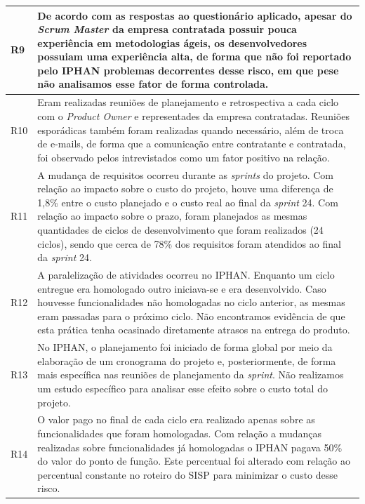 \begin{longtable}{|p{2cm}|p{13cm}|}
R9                                                                & De acordo com as respostas ao questionário aplicado, apesar do \textit{Scrum Master} da empresa contratada possuir pouca experiência em metodologias ágeis, os desenvolvedores possuiam uma experiência alta, de forma que não foi reportado pelo IPHAN problemas decorrentes desse risco, em que pese não analisamos esse fator de forma controlada.              \\ \hline
R10                                                               &  Eram realizadas reuniões de planejamento e retrospectiva a cada ciclo com o \textit{Product Owner} e representades da empresa contratadas. Reuniões esporádicas também foram realizadas quando necessário, além de troca de e-mails, de forma que a comunicação entre contratante e contratada, foi observado pelos intrevistados como um fator positivo na relação.                \\ \hline
R11                                                               & A mudança de requisitos ocorreu  durante as \textit{sprints} do projeto. Com relação ao impacto sobre o custo do projeto, houve uma diferença de 1,8\% entre o custo planejado e o custo real ao final da \textit{sprint} 24. Com relação ao impacto sobre o prazo, foram planejados as mesmas quantidades de ciclos de desenvolvimento que foram realizados (24 ciclos), sendo que cerca de 78\% dos requisitos foram atendidos ao final da \textit{sprint} 24.         \\ \hline
R12                                                               & A paralelização de atividades ocorreu no IPHAN. Enquanto um ciclo entregue era homologado outro iniciava-se e era desenvolvido. Caso houvesse funcionalidades não homologadas no ciclo anterior, as mesmas eram passadas para o próximo ciclo. Não encontramos evidência de que esta prática tenha ocasinado diretamente atrasos na entrega do produto.             \\ \hline
R13                                                               & No IPHAN, o planejamento foi iniciado de forma global por meio da elaboração de um cronograma do projeto e, posteriormente, de forma mais específica nas reuniões de planejamento da \textit{sprint}. Não realizamos um estudo específico para analisar esse efeito sobre o custo total do projeto.             \\ \hline
R14                                                               & O valor pago no final de cada ciclo era realizado apenas sobre as funcionalidades que foram homologadas. Com relação a mudanças realizadas sobre funcionalidades já homologadas o IPHAN pagava 50\% do valor do ponto de função. Este percentual foi alterado com relação ao percentual constante no roteiro do SISP para minimizar o custo desse risco.           \\ \hline

\end{longtable}
